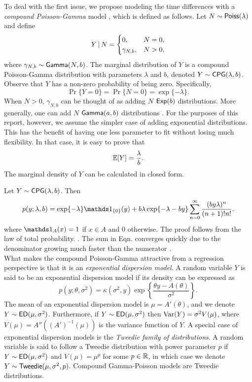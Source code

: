 \documentclass[aos,preprint]{imsart}
\begin{document}
To deal with the first issue, we propose modeling the time differences with a \textit{compound Poisson-Gamma} model \citep{tweedie1984, jorgensen1987}, which is defined as follows. Let $N \sim {\sf{Poiss}}(\lambda)$ and define
\[
  Y \given N = \begin{cases}
    0, & N = 0, \\
    \gamma_{N, b}, & N > 0,
  \end{cases}
\]
where $\gamma_{N, b} \sim {\sf{Gamma}}(N, b)$. The marginal distribution of $Y$ is a compound Poisson-Gamma distribution with parameters $\lambda$ and $b$, denoted $Y \sim {\sf{CPG}}(\lambda, b)$. Observe that $Y$ has a non-zero probability of being zero. Specifically,
\[
  \Pr \{ Y = 0 \} = \Pr \{ N = 0 \} = \exp \{ -\lambda \}.
\]
When $N > 0$, $\gamma_{N, b}$ can be thought of as adding $N$ \iid ${\sf{Exp}}(b)$ distributions. More generally, one can add $N$ \iid ${\sf{Gamma}}(a, b)$ distributions \citep[see][]{withers2011}. For the purposes of this report, however, we assume the simpler case of adding exponential distributions. This has the benefit of having one less parameter to fit without losing much flexibility. In that case, it is easy to prove that
\[
  \mathbb{E} [Y] = \frac{\lambda}{b}.
\]
The marginal density of $Y$ can be calculated in closed form.

\bnprop
  Let $Y \sim {\sf{CPG}}(\lambda, b)$. Then
  \[
    p(y; \lambda, b) = \exp\{ -\lambda \} \ind_{\{0\}}(y) + b \lambda \exp \{ -\lambda - by \} \sum_{n=0}^\infty \frac{(b y \lambda)^n}{(n+1)! n!}. \label{eq:cpg-pdf}
  \]
  where $\ind_A(x) = 1$ if $x \in A$ and 0 otherwise.
\enprop
The proof follows from the law of total probability. \cite[See][for example]{ozturk1981}. The sum in Eqn.  converges quickly due to the denominator growing much faster than the numerator \citep{withers2011}. \\


What makes the compound Poisson-Gamma attractive from a regression perspective is that it is an \textit{exponential dispersion model}. A random variable $Y$ is said to be an exponential dispersion model if its density can be expressed as
\[
  p(y; \theta, \sigma^2) = \kappa(\sigma^2, y) \exp \left\{ \frac{\theta y - A(\theta)}{\sigma^2} \right\}.
\]
The mean of an exponential dispersion model is $\mu = A'(\theta)$, and we denote $Y \sim {\sf{ED}}(\mu, \sigma^2)$. Furthermore, if $Y \sim {\sf{ED}}(\mu, \sigma^2)$ then $\operatorname{Var} (Y) = \sigma^2 V(\mu)$, where $V(\mu) = A''((A')^{-1}(\mu))$ is the variance function of $Y$. A special case of exponential dispersion models is the \textit{Tweedie family of distributions}. A random variable is said to follow a Tweedie distribution with power parameter $p$ if $Y \sim {\sf{ED}}(\mu, \sigma^2)$ and $V(\mu) = \mu^p$ for some $p \in \mathbb{R}$, in which case we denote $Y \sim {\sf{Tweedie}}(\mu, \sigma^2, p)$. Compound Gamma-Poisson models are Tweedie distributions. \\
\end{document}
